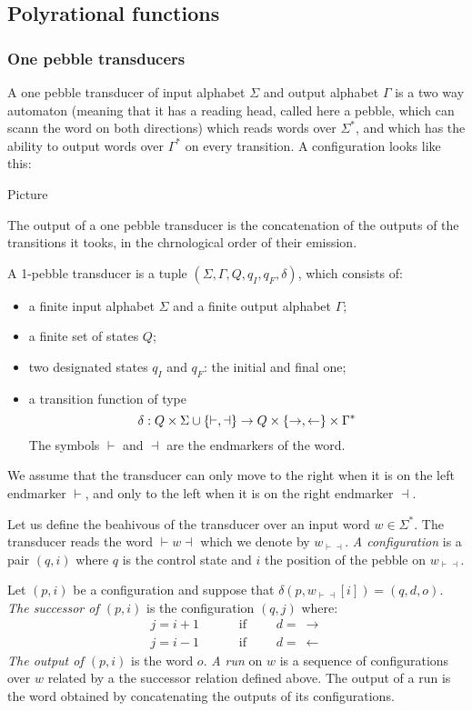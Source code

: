 \subsection{Polyrational functions}

\subsubsection{One pebble transducers}
A one pebble transducer of input alphabet $\Sigma$ and output alphabet $\Gamma$ is a two way automaton (meaning that it has a reading head, called here a pebble, which can scann the word on both directions) which reads words over $\Sigma^*$, and which has the ability to output words over $\Gamma^*$ on every transition. A configuration looks like this:
\begin{center}
Picture
\end{center} 
The output of a one pebble transducer is the concatenation of the outputs of the transitions it tooks, in the chrnological order of their emission.

\begin{definition}\label{def:1pebble}
A 1-pebble transducer is a tuple $(\Sigma,\Gamma, Q, q_I, q_F, \delta)$, which consists of:
\begin{itemize}
\item a finite input alphabet $\Sigma$ and a finite output alphabet $\Gamma$; 
\item a finite set of states $Q$;
\item two designated states $q_I$ and $q_F$: the initial and final one;
\item  a transition function of type 
$$\delta : Q\times \Sigma\cup\{\vdash,\dashv\} \to Q\times\{\rightarrow,\leftarrow\}\times\Gamma^*$$
The symbols  $\vdash$ and $\dashv$ are the endmarkers of the word. 
\end{itemize}
We assume that the transducer can only move to the right when it is on the left endmarker $\vdash$, and only to the left when  it is on the right endmarker $\dashv$.
 \end{definition}


Let us define the beahivous of the transducer over an input word $w\in\Sigma^*$. The transducer reads the word $\vdash\!w\!\dashv$ which we denote by  $w_{\vdash\dashv}$. \emph{A configuration} is a pair $(q,i)$ where $q$ is the control state and $i$ the position of the pebble on $w_{\vdash\dashv}$. 

Let $(p,i)$ be a configuration and suppose that $\delta(p, w_{\vdash\dashv}[i])=(q,d,o)$. \emph{The successor of $(p,i)$} is the configuration $(q,j)$
where:
\begin{align*}
 j=i+1 &\qquad \text{ if }\qquad d=\ \rightarrow\\
 j=i-1 &\qquad \text{ if }\qquad d=\ \leftarrow 
\end{align*}
\emph{The output of $(p,i)$} is the word $o$. \emph{A run} on $w$ is a sequence of configurations over $w$ related by a the successor relation defined above. The output of a run is the word obtained by concatenating the outputs of its configurations.

